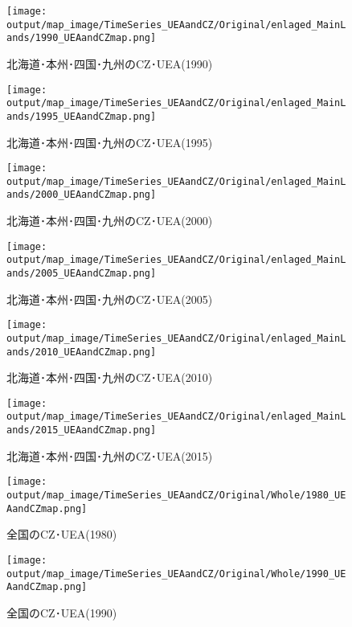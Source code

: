 \documentclass{ltjsarticle}
\begin{document}
\begin{figure}[pbth]
  \centering
  \texttt{[image: output/map\_image/TimeSeries\_UEAandCZ/Original/enlaged\_MainLands/1990\_UEAandCZmap.png]}
  \caption{\label{ori:tsM1990}北海道･本州･四国･九州のCZ･UEA(1990)}
\end{figure}

\begin{figure}[pbth]
  \centering
  \texttt{[image: output/map\_image/TimeSeries\_UEAandCZ/Original/enlaged\_MainLands/1995\_UEAandCZmap.png]}
  \caption{\label{ori:tsM1995}北海道･本州･四国･九州のCZ･UEA(1995)}
\end{figure}

\begin{figure}[pbth]
  \centering
  \texttt{[image: output/map\_image/TimeSeries\_UEAandCZ/Original/enlaged\_MainLands/2000\_UEAandCZmap.png]}
  \caption{\label{ori:tsM2000}北海道･本州･四国･九州のCZ･UEA(2000)}
\end{figure}

\begin{figure}[pbth]
  \centering
  \texttt{[image: output/map\_image/TimeSeries\_UEAandCZ/Original/enlaged\_MainLands/2005\_UEAandCZmap.png]}
  \caption{\label{ori:tsM2005}北海道･本州･四国･九州のCZ･UEA(2005)}
\end{figure}

\begin{figure}[pbth]
  \centering
  \texttt{[image: output/map\_image/TimeSeries\_UEAandCZ/Original/enlaged\_MainLands/2010\_UEAandCZmap.png]}
  \caption{\label{ori:tsM2010}北海道･本州･四国･九州のCZ･UEA(2010)}
\end{figure}

\begin{figure}[pbth]
  \centering
  \texttt{[image: output/map\_image/TimeSeries\_UEAandCZ/Original/enlaged\_MainLands/2015\_UEAandCZmap.png]}
  \caption{\label{ori:tsM2015}北海道･本州･四国･九州のCZ･UEA(2015)}
\end{figure}

  \begin{figure}[pbth]
    \centering
    \texttt{[image: output/map\_image/TimeSeries\_UEAandCZ/Original/Whole/1980\_UEAandCZmap.png]}
    \caption{\label{ori:tsA1980}全国のCZ･UEA(1980)}
  \end{figure}
  
  \begin{figure}[pbth]
    \centering
    \texttt{[image: output/map\_image/TimeSeries\_UEAandCZ/Original/Whole/1990\_UEAandCZmap.png]}
    \caption{\label{ori:tsA1990}全国のCZ･UEA(1990)}
  \end{figure}
  
\end{document}
